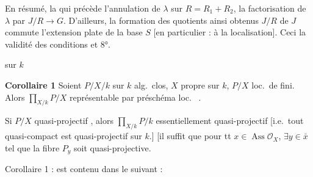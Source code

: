 \documentclass[11pt,a4paper]{article}
\begin{document}



En résumé, la  qui précède 
l'annulation de $\lambda$ sur $R = R_1 + R_2$,
 la factorisation de $\lambda$ par $J/R \to G$.
D'ailleurs, la formation des quotients ainsi obtenus
$J/R$ de $J$ commute  l'extension plate
de la base $S$ [en particulier : à la
localisation]. Ceci  la validité des
conditions   et 8°.


 sur $k$

\textbf{Corollaire 1} Soient $P/X/k$ sur $k$ alg.\ clos,
$X$ propre sur $k$, $P/X$ loc.\ de   fini. Alors
$\prod_{X/k} P/X$ représentable par préschéma
loc.\   .
\struck{\ill{}}

Si $P/X$ quasi-projectif ,
alors $\prod_{X/k} P/k$  essentiellement quasi-projectif
[i.e.\ tout  quasi-compact est
quasi-projectif sur $k$.]
[il suffit que pour tt $x \in \operatorname{Ass}\mathcal{O}_X$, $\exists y \in \bar{x}$ tel que
la fibre $P_y$ soit quasi-projective.

Corollaire 1 : est contenu dans le suivant :
\end{document}
